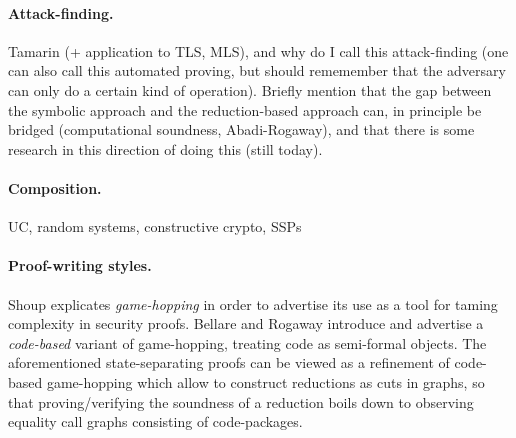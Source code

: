 {{\color{blue}
\paragraph{Attack-finding.} Tamarin (+ application to TLS, MLS), and why do I call this attack-finding (one can also call this automated proving, but should rememember that the adversary can only do a certain kind of operation). Briefly mention that the gap between the symbolic approach and the reduction-based approach can, in principle be bridged (computational soundness, Abadi-Rogaway), and that there is some research in this direction of doing this (still today).

\paragraph{Composition.} UC, random systems, constructive crypto, SSPs}

\paragraph{Proof-writing styles.}
Shoup explicates \emph{game-hopping} in order to advertise its use as a tool for taming complexity in security proofs. 
Bellare and Rogaway introduce and advertise a \emph{code-based} variant of
game-hopping, treating code as semi-formal objects. 
The aforementioned state-separating proofs can be viewed as a refinement of code-based game-hopping which allow to construct reductions as cuts in graphs, so that proving/verifying the soundness of a reduction boils down to observing equality call graphs consisting of code-packages.

}
